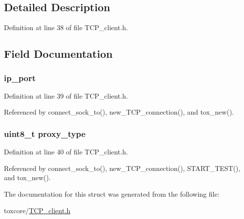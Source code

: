 \subsection{Detailed Description}


Definition at line 38 of file T\+C\+P\+\_\+client.\+h.



\subsection{Field Documentation}
\hypertarget{struct_t_c_p___proxy___info_a86e2a5a56c0dd22df6e8b8a10e40f9e4}{
\subsubsection[{ip\+\_\+port}]{ ip\+\_\+port}}\label{struct_t_c_p___proxy___info_a86e2a5a56c0dd22df6e8b8a10e40f9e4}


Definition at line 39 of file T\+C\+P\+\_\+client.\+h.



Referenced by connect\+\_\+sock\+\_\+to(), new\+\_\+\+T\+C\+P\+\_\+connection(), and tox\+\_\+new().

\hypertarget{struct_t_c_p___proxy___info_a23a098bd0536ae2000e1944e353b7d8b}{
\subsubsection[{proxy\+\_\+type}]{\setlength{\rightskip}{0pt plus 5cm}uint8\+\_\+t proxy\+\_\+type}}\label{struct_t_c_p___proxy___info_a23a098bd0536ae2000e1944e353b7d8b}


Definition at line 40 of file T\+C\+P\+\_\+client.\+h.



Referenced by connect\+\_\+sock\+\_\+to(), new\+\_\+\+T\+C\+P\+\_\+connection(), S\+T\+A\+R\+T\+\_\+\+T\+E\+S\+T(), and tox\+\_\+new().



The documentation for this struct was generated from the following file\+:\begin{DoxyCompactItemize}
\item 
toxcore/\hyperlink{_t_c_p__client_8h}{T\+C\+P\+\_\+client.\+h}\end{DoxyCompactItemize}
